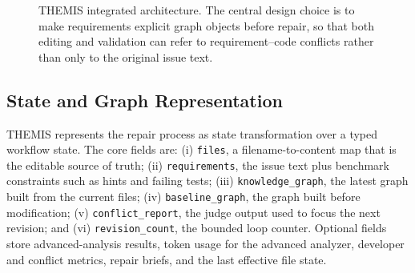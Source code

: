 \documentclass[11pt]{article}
\begin{document}
\begin{figure}[t]
\centering
{}
\caption{THEMIS integrated architecture.  The central design choice is to make requirements explicit graph objects before repair, so that both editing and validation can refer to requirement--code conflicts rather than only to the original issue text.}
\label{fig:themis-architecture}
\end{figure}

\subsection{State and Graph Representation}
\label{subsec:state-graph}

THEMIS represents the repair process as state transformation over a typed workflow state.  The core fields are: (i) \texttt{files}, a filename-to-content map that is the editable source of truth; (ii) \texttt{requirements}, the issue text plus benchmark constraints such as hints and failing tests; (iii) \texttt{knowledge\_graph}, the latest graph built from the current files; (iv) \texttt{baseline\_graph}, the graph built before modification; (v) \texttt{conflict\_report}, the judge output used to focus the next revision; and (vi) \texttt{revision\_count}, the bounded loop counter.  Optional fields store advanced-analysis results, token usage for the advanced analyzer, developer and conflict metrics, repair briefs, and the last effective file state.
\end{document}
